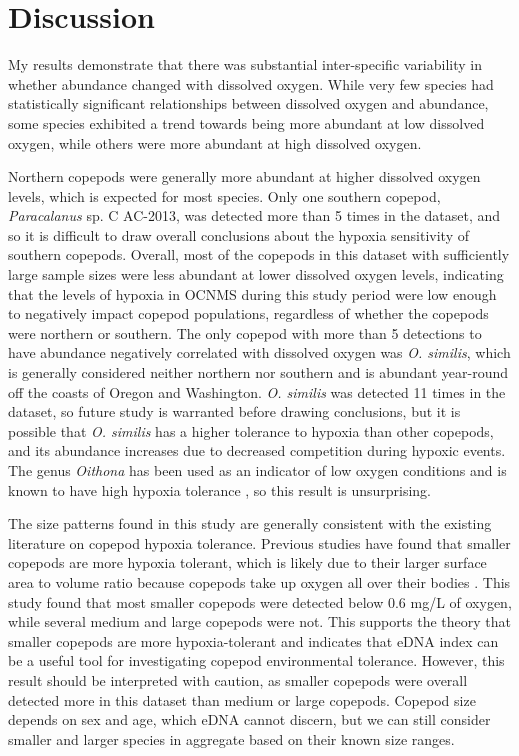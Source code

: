 \documentclass[12pt,twoside]{reedthesis}
\begin{document}
{	
	\chapter{Discussion}
	
	My results demonstrate that there was substantial inter-specific variability in whether abundance changed with dissolved oxygen. While very few species had statistically significant relationships between dissolved oxygen and abundance, some species exhibited a trend towards being more abundant at low dissolved oxygen, while others were more abundant at high dissolved oxygen. 
	
	Northern copepods were generally more abundant at higher dissolved oxygen levels, which is expected for most species. Only one southern copepod, \textit{Paracalanus} sp. C AC-2013, was detected more than 5 times in the dataset, and so it is difficult to draw overall conclusions about the hypoxia sensitivity of southern copepods. Overall, most of the copepods in this dataset with sufficiently large sample sizes were less abundant at lower dissolved oxygen levels, indicating that the levels of hypoxia in OCNMS during this study period were low enough to negatively impact copepod populations, regardless of whether the copepods were northern or southern. The only copepod with more than 5 detections to have abundance negatively correlated with dissolved oxygen was \textit{O. similis}, which is generally considered neither northern nor southern and is abundant year-round off the coasts of Oregon and Washington. \textit{O. similis} was detected 11 times in the dataset, so future study is warranted before drawing conclusions, but it is possible that \textit{O. similis} has a higher tolerance to hypoxia than other copepods, and its abundance increases due to decreased competition during hypoxic events. The genus \textit{Oithona} has been used as an indicator of low oxygen conditions \autocite{Richard2001} and is known to have high hypoxia tolerance \autocite{Roman1993}, so this result is unsurprising. 
	
	The size patterns found in this study are generally consistent with the existing literature on copepod hypoxia tolerance. Previous studies have found that smaller copepods are more hypoxia tolerant, which is likely due to their larger surface area to volume ratio because copepods take up oxygen all over their bodies \autocite{Portner2010, Roman2019}. This study found that most smaller copepods were detected below 0.6 mg/L of oxygen, while several medium and large copepods were not. This supports the theory that smaller copepods are more hypoxia-tolerant and indicates that eDNA index can be a useful tool for investigating copepod environmental tolerance. However, this result should be interpreted with caution, as smaller copepods were overall detected more in this dataset than medium or large copepods. Copepod size depends on sex and age, which eDNA cannot discern, but we can still consider smaller and larger species in aggregate based on their known size ranges. 
	
}
\end{document}
